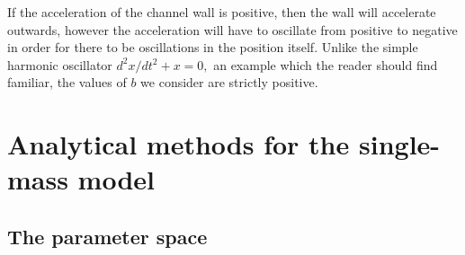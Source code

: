 \documentclass{article}
\begin{document}

If the acceleration of the channel wall is positive, then the wall will accelerate outwards,
however the acceleration will have to oscillate from positive to negative in order for there to be oscillations in the position itself.
Unlike the simple harmonic oscillator $d^2 x/dt^2 + x = 0,$ an example which the reader should find familiar, the values of $b$ we consider are strictly positive.

\section{Analytical methods for the single-mass model}



\subsection{The parameter space}
\end{document}
